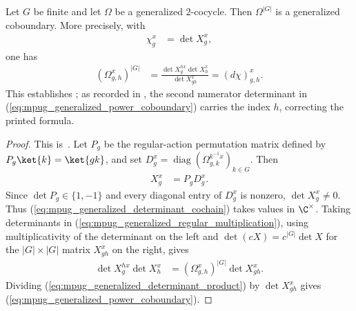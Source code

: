 \begin{lemma}
    \label{thm:mpug_generalized_cocycle_power}
    \leanok
    Let $G$ be finite and let $\Omega$ be a generalized $2$-cocycle. Then
    $\Omega^{|G|}$ is a generalized coboundary. More precisely, with
    \begin{align}
        \chi^x_g
         & =\det X^x_g,
        \label{eq:mpug_generalized_determinant_cochain}
    \end{align}
    one has
    \begin{align}
        \left(\Omega^x_{g,h}\right)^{|G|}
         & =\frac{\det X^{h x}_g\det X^x_h}{\det X^x_{gh}}
        =(d\chi)^x_{g,h}.
        \label{eq:mpug_generalized_power_coboundary}
    \end{align}
    This establishes
    \cite[Lemma~\texttt{lemma:G\_cocycle}]{FrancoRubio2025MPUGauging}; as
    recorded in \cite{gap:fbc25_generalized_cocycle_determinant_typo}, the
    second numerator determinant in
    (\ref{eq:mpug_generalized_power_coboundary}) carries the index $h$,
    correcting the printed formula.

\end{lemma}

\begin{proof}\leanok
    This is~\cite[``Finite-group power trivialization'']{QICLean2026Blueprint}.
    Let $P_g$ be the regular-action permutation matrix defined by
    $P_g\ket{k}=\ket{gk}$, and set
    $D^x_g=\operatorname{diag}(\Omega^{k^{-1}x}_{g,k})_{k\in G}$.
    Then
    \begin{align}
        X^x_g
         & =P_gD^x_g.
    \end{align}
    Since $\det P_g\in\{1,-1\}$ and every diagonal entry of $D^x_g$
    is nonzero, $\det X^x_g\ne0$. Thus
    (\ref{eq:mpug_generalized_determinant_cochain}) takes values in
    $\C^\times$. Taking determinants in
    (\ref{eq:mpug_generalized_regular_multiplication}), using
    multiplicativity of the determinant on the left and
    $\det(cX)=c^{|G|}\det X$ for the $|G|\times|G|$ matrix $X^x_{gh}$ on the
    right, gives
    \begin{align}
        \det X^{h x}_g\det X^x_h
         & =\left(\Omega^x_{g,h}\right)^{|G|}\det X^x_{gh}.
        \label{eq:mpug_generalized_determinant_product}
    \end{align}
    Dividing (\ref{eq:mpug_generalized_determinant_product}) by
    $\det X^x_{gh}$ gives
    (\ref{eq:mpug_generalized_power_coboundary}).
\end{proof}

